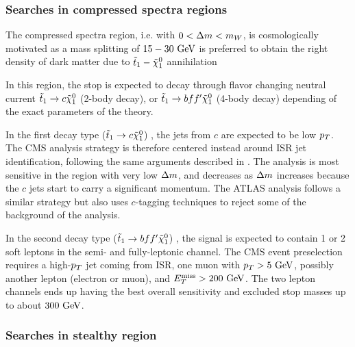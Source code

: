     \subsubsection{Searches in compressed spectra regions}

    The compressed spectra region, i.e. with $0 < \Delta m < m_{W}$, is cosmologically
    motivated as a mass splitting of $15-30~\text{GeV}$ is preferred to obtain the right density
    of dark matter due to $\tilde{t}_1-\tilde{\chi}_1^0$ annihilation \cite{TheLightStopWindow,SUSYBaryogenesis}

    In this region, the stop is expected to decay through flavor changing neutral current
    $\tilde{t}_1 \rightarrow c \tilde{\chi}_1^0$ (2-body decay), or $\tilde{t}_1 \rightarrow bff' \tilde{\chi}_1^0$
    (4-body decay) depending of the exact parameters of the theory.

    In the first decay type ($\tilde{t}_1 \rightarrow c \tilde{\chi}_1^0$) \cite{SUS-14-001, ATLASstopSearches},
    the jets from $c$ are expected to be low $p_T$. The CMS analysis strategy is therefore
    centered instead around ISR jet identification, following the same arguments described
    in . The analysis is most sensitive in the region with very
    low $\Delta m$, and decreases as $\Delta m$ increases because the $c$ jets start to carry
    a significant momentum. The ATLAS analysis follows a similar strategy but also uses
    $c$-tagging techniques to reject some of the background of the analysis.

    In the second decay type ($\tilde{t}_1 \rightarrow bff' \tilde{\chi}_1^0$) \cite{SUS-14-021, ATLASstopSearches},
    the signal is expected to contain 1 or 2 soft leptons in the semi- and fully-leptonic channel.
    The CMS event preselection
    requires a high-$p_T$ jet coming from ISR, one muon with $p_T > 5~\text{GeV}$, possibly another
    lepton (electron or muon), and $E_T^\text{miss} > 200~\text{GeV}$. The two lepton channels ends up having
    the best overall sensitivity and excluded stop masses up to about $300~\text{GeV}$.

    \subsubsection{Searches in stealthy region}

